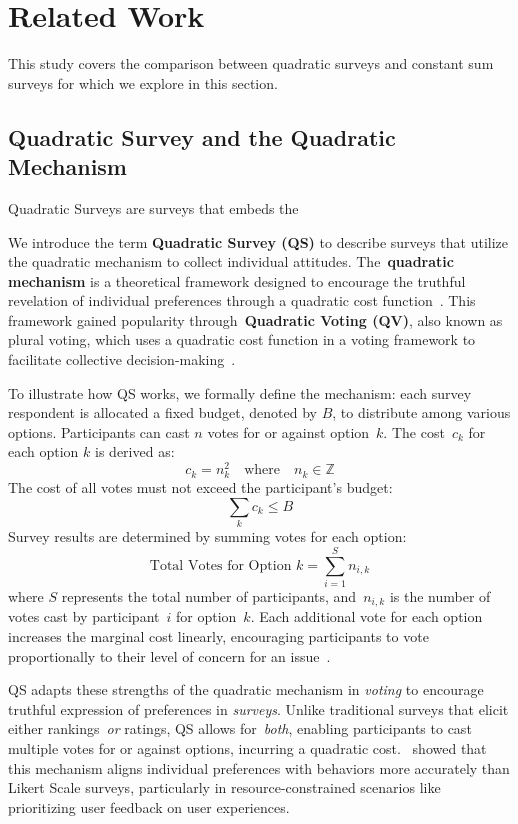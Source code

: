 \section{Related Work}
\label{sec:relatedWorks}
This study covers the comparison between quadratic surveys and constant sum surveys for which we explore in this section.

\subsection{Quadratic Survey and the Quadratic Mechanism}
Quadratic Surveys are surveys that embeds the 



We introduce the term \textbf{Quadratic Survey (QS)} to describe surveys that utilize the quadratic mechanism to collect individual attitudes. The~\textbf{quadratic mechanism} is a theoretical framework designed to encourage the truthful revelation of individual preferences through a quadratic cost function~\cite{grovesOptimalAllocationPublic1977}. This framework gained popularity through~\textbf{Quadratic Voting (QV)}, also known as plural voting, which uses a quadratic cost function in a voting framework to facilitate collective decision-making~\cite{lalley2016quadratic}.

To illustrate how QS works, we formally define the mechanism: each survey respondent is allocated a fixed budget, denoted by $B$, to distribute among various options. Participants can cast $n$ votes for or against option~$k$. The cost~$c_k$ for each option $k$ is derived as:
\begin{equation*}
c_k = n_k^2 \quad \text{where}\quad n_k \in \mathbb{Z}
\end{equation*}
The cost of all votes must not exceed the participant's budget:
\begin{equation*}
\sum_k c_k \leq B
\end{equation*}
Survey results are determined by summing votes for each option:
\begin{equation*}
\text{Total Votes for Option } k = \sum_{i=1}^{S} n_{i,k}    
\end{equation*}
where $S$ represents the total number of participants, and~$n_{i,k}$ is the number of votes cast by participant~$i$ for option~$k$. Each additional vote for each option increases the marginal cost linearly, encouraging participants to vote proportionally to their level of concern for an issue~\cite{posner2018radical}.

QS adapts these strengths of the quadratic mechanism in \textit{voting} to encourage truthful expression of preferences in \textit{surveys}. Unlike traditional surveys that elicit either rankings~\textit{or} ratings, QS allows for~\textit{both}, enabling participants to cast multiple votes for or against options, incurring a quadratic cost.~\citet{chengCanShowWhat2021} showed that this mechanism aligns individual preferences with behaviors more accurately than Likert Scale surveys, particularly in resource-constrained scenarios like prioritizing user feedback on user experiences.

